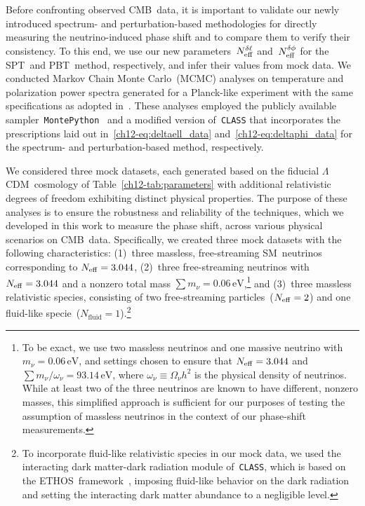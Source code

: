 Before confronting observed CMB~data, it is important to validate our newly introduced spectrum- and perturbation-based methodologies for directly measuring the neutrino-induced phase shift and to compare them to verify their consistency. To this end, we use our new parameters~$N_\mathrm{eff}^{\delta\ell}$ and~$N_\mathrm{eff}^{\delta\phi}$ for the SPT~and PBT~method, respectively, and infer their values from mock data. We conducted Markov Chain Monte Carlo~(MCMC) analyses on temperature and polarization power spectra generated for a Planck-like experiment with the same specifications as adopted in~\cite{Allison:2015qca}. These analyses employed the publicly available sampler~\texttt{MontePython}~\cite{Audren:2012wb, Brinckmann:2018cvx} and a modified version of~\texttt{CLASS} that incorporates the prescriptions laid out in~\eqref{ch12-eq:deltaell_data} and~\eqref{ch12-eq:deltaphi_data} for the spectrum- and perturbation-based method, respectively.\medskip

We considered three mock datasets, each generated based on the fiducial $\Lambda$CDM~cosmology of Table~\ref{ch12-tab:parameters} with additional relativistic degrees of freedom exhibiting distinct physical properties. The purpose of these analyses is to ensure the robustness and reliability of the techniques, which we developed in this work to measure the phase shift, across various physical scenarios on CMB~data. Specifically, we created three mock datasets with the following characteristics: (1)~three massless, free-streaming SM~neutrinos corresponding to $N_\mathrm{eff} = 3.044$, (2)~three free-streaming neutrinos with $N_\mathrm{eff} = 3.044$ and a nonzero total mass $\sum m_\nu = 0.06\,\mathrm{eV}$,\footnote{To be exact, we use two massless neutrinos and one massive neutrino with $m_\nu = 0.06\,\mathrm{eV}$, and settings chosen to ensure that $N_\mathrm{eff} = 3.044$ and $\sum m_\nu /\omega_\nu = 93.14\,\mathrm{eV}$, where $\omega_\nu \equiv \Omega_\nu h^2$ is the physical density of neutrinos. While at least two of the three neutrinos are known to have different, nonzero masses, this simplified approach is sufficient for our purposes of testing the assumption of massless neutrinos in the context of our phase-shift measurements.} and (3)~three massless relativistic species, consisting of two free-streaming particles~($N_\mathrm{eff} = 2$) and one fluid-like specie~\mbox{($N_\mathrm{fluid} = 1$)}.\footnote{To incorporate fluid-like relativistic species in our mock data, we used the interacting dark matter-dark radiation module of~\texttt{CLASS}, which is based on the ETHOS~framework~\cite{Cyr-Racine:2015ihg}, imposing fluid-like behavior on the dark radiation and setting the interacting dark matter abundance to a negligible level.}

